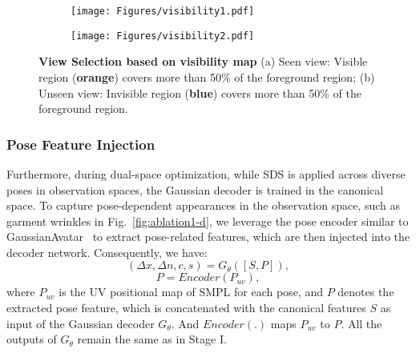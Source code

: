 \begin{figure}[tb]
    \centering
    \begin{subfigure}[b]{0.4\linewidth}
        \texttt{[image: Figures/visibility1.pdf]}
        \caption{}
        \label{fig:visibility1}
    \end{subfigure}
    \hspace{0.05\linewidth}
    \begin{subfigure}[b]{0.35\linewidth}
        \texttt{[image: Figures/visibility2.pdf]}
        \caption{}
        \label{fig:visibility2}
    \end{subfigure}

    \caption{\textbf{View Selection based on visibility map} (a) Seen view: Visible region (\textbf{\textcolor{myorange}{orange}}) covers more than 50\% of the foreground region; (b) Unseen view: Invisible region (\textbf{\textcolor{myblue}{blue}}) covers more than 50\% of the foreground region.}
    \vspace{-3mm}
    \label{fig:visibility}
\end{figure}

\subsubsection{Pose Feature Injection}
\label{poseInject}
Furthermore, during dual-space optimization, while SDS is applied across diverse poses in observation spaces, the Gaussian decoder is trained in the canonical space. To capture pose-dependent appearances in the observation space, such as garment wrinkles in Fig.~\ref{fig:ablation1-d}, we leverage the pose encoder similar to GaussianAvatar~\cite{hu2023gaussianavatar} to extract pose-related features, which are then injected into the decoder network. Consequently,  we have:
\begin{equation}
  (\Delta x, \Delta n,c,s)=G_{\theta}([S,P]),
  \label{eq:stage2G_decoder}
\end{equation}
\begin{equation}
  P = Encoder(P_{uv}),
  \label{eq:poseencoder}
\end{equation}
where $P_{uv}$ is the UV positional map of SMPL for each pose, and $P$ denotes the extracted pose feature, which is concatenated with the canonical features $S$ as input of the Gaussian decoder $G_{\theta}$. And $Encoder(.)$ maps $P_{uv}$ to $P$. All the outputs of $G_{\theta}$ remain the same as in Stage I.


